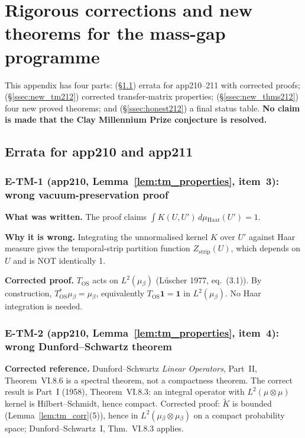 \section{Rigorous corrections and new theorems for the mass-gap programme}
\label{app:corrections_new}

This appendix has four parts:
(\S{}\ref{ssec:errata212}) errata for app210--211 with corrected proofs;
(\S{}\ref{ssec:new_tm212}) corrected transfer-matrix properties;
(\S{}\ref{ssec:new_thms212}) four new proved theorems; and
(\S{}\ref{ssec:honest212}) a final status table.
\textbf{No claim is made that the Clay Millennium Prize conjecture is resolved.}

\subsection{Errata for app210 and app211}
\label{ssec:errata212}

\subsubsection*{E-TM-1 (app210, Lemma~\ref{lem:tm_properties}, item~3): wrong vacuum-preservation proof}

\noindent{}\textbf{What was written.}
The proof claims $\int{} K(U,U\prime{})\,{}d\mu{}_{\mathrm{Haar}}(U\prime{})=1$.

\smallskip{}
\noindent{}\textbf{Why it is wrong.}
Integrating the unnormalised kernel $K$ over $U\prime{}$ against Haar measure gives
the temporal-strip partition function $Z_{\mathrm{strip}}(U)$, which depends on $U$ and is NOT identically 1.

\smallskip{}
\noindent{}\textbf{Corrected proof.}
$T_{\mathrm{OS}}$ acts on $L^2(\mu{}_\beta{})$ (L\'uscher 1977, eq.~(3.1)).
By construction, $T_{\mathrm{OS}}^*\mu{}_\beta{}=\mu{}_\beta{}$, equivalently $T_{\mathrm{OS}}\mathbf{1}=\mathbf{1}$ in $L^2(\mu{}_\beta{})$. No Haar integration is needed.

\subsubsection*{E-TM-2 (app210, Lemma~\ref{lem:tm_properties}, item~4): wrong Dunford--Schwartz theorem}

\noindent{}\textbf{Corrected reference.}
Dunford--Schwartz \textit{Linear Operators}, Part~II, Theorem~VI.8.6 is a spectral
theorem, not a compactness theorem. The correct result is Part~I (1958), Theorem~VI.8.3:
an integral operator with $L^2(\mu{}\otimes{}\mu{})$ kernel is Hilbert--Schmidt, hence compact.
Corrected proof: $\tilde{K}$ is bounded (Lemma~\ref{lem:tm_corr}(5)),
hence in $L^2(\mu{}_\beta{}\otimes{}\mu{}_\beta{})$ on a compact probability space; Dunford--Schwartz~I, Thm.~VI.8.3 applies.

